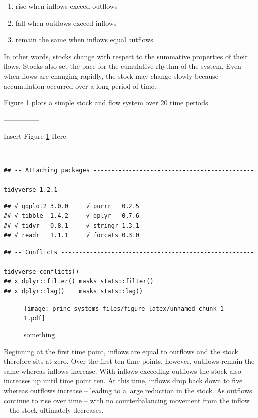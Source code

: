 \documentclass[]{article}
\providecommand{\tightlist}{%
  \setlength{\itemsep}{0pt}\setlength{\parskip}{0pt}}
\begin{document}
\begin{enumerate}
\def\labelenumi{\arabic{enumi}.}
\tightlist
\item
  rise when inflows exceed outflows
\item
  fall when outflows exceed inflows
\item
  remain the same when inflows equal outflows.
\end{enumerate}

\noindent In other words, stocks change with respect to the summative
properties of their flows. Stocks also set the pace for the cumulative
rhythm of the system. Even when flows are changing rapidly, the stock
may change slowly because accumulation occurred over a long period of
time.

Figure \ref{stocks} plots a simple stock and flow system over 20 time
periods.

\begin{center}

---------------

Insert Figure \ref{stocks} Here

---------------

\end{center}

\begin{verbatim}
## -- Attaching packages ------------------------------------------------------------------------------------------------------------ tidyverse 1.2.1 --
\end{verbatim}

\begin{verbatim}
## √ ggplot2 3.0.0     √ purrr   0.2.5
## √ tibble  1.4.2     √ dplyr   0.7.6
## √ tidyr   0.8.1     √ stringr 1.3.1
## √ readr   1.1.1     √ forcats 0.3.0
\end{verbatim}

\begin{verbatim}
## -- Conflicts --------------------------------------------------------------------------------------------------------------- tidyverse_conflicts() --
## x dplyr::filter() masks stats::filter()
## x dplyr::lag()    masks stats::lag()
\end{verbatim}

\begin{figure}
\centering
\texttt{[image: princ\_systems\_files/figure-latex/unnamed-chunk-1-1.pdf]}
\caption{something\label{stocks}}
\end{figure}

\noindent Beginning at the first time point, inflows are equal to
outflows and the stock therefore sits at zero. Over the first ten time
points, however, outflows remain the same whereas inflows increase. With
inflows exceeding outflows the stock also increases up until time point
ten. At this time, inflows drop back down to five whereas outflows
increase -- leading to a large reduction in the stock. As outflows
continue to rise over time -- with no counterbalancing movement from the
inflow -- the stock ultimately decreases.
\end{document}

